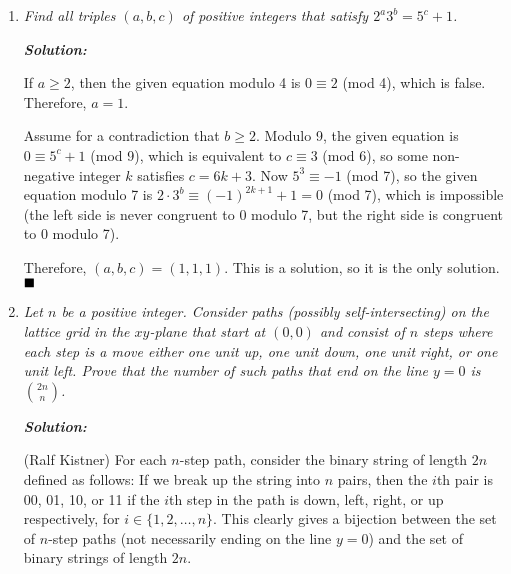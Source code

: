 \documentclass[12pt]{article}
\newcommand{\sol}{\textbf{\textit{Solution: }}}
\begin{document}
\begin{enumerate}
\begin{itemize}
\end{itemize}
Now
\[\begin{aligned}
2022 & = f(2^{2023}) + f(3^{2024}) + f(5^{2025})\\
& = \left(\frac{2 - 2023}{2} + \frac{2 - 2024}{2} + \frac{2 - 2025}{2}\right)f(1)\\
& = -3033f(1),
\end{aligned}\]
so \(f(1) = -2/3\). Therefore, for all positive integers \(n\), we have
\[f(n) = \frac{\Omega(n) - 2}{3}.\]
Now \(2023 = 7 \times 17^{2}\), \(2024 = 2^{3} \times 11 \times 23\), and \(2025 = 3^{4} \times 5^{2}\), so \(\Omega(2023^{2}) = 6\), \(\Omega(2024^{3}) = 15\), and \(\Omega(2025^{5}) = 30\), so
\[f(2023^{2}) + f(2024^{3}) + f(2025^{5}) = \frac{6 - 2}{3} + \frac{15 - 2}{3} + \frac{30 - 2}{3} = 15.\]
This completes the solution. $\hfill\blacksquare$

\item \textit{Find all triples \((a, b, c)\) of positive integers that satisfy \(2^{a}3^{b} = 5^{c} + 1\).}

\sol

If \(a \geqslant 2\), then the given equation modulo 4 is \(0 \equiv 2\) (mod 4), which is false. Therefore, \(a = 1\).

Assume for a contradiction that \(b \geqslant 2\). Modulo 9, the given equation is \(0 \equiv 5^{c} + 1\) (mod 9), which is equivalent to \(c \equiv 3\) (mod 6), so some non-negative integer \(k\) satisfies \(c = 6k + 3\). Now \(5^{3} \equiv -1\) (mod 7), so the given equation modulo 7 is \(2\cdot{}3^{b} \equiv (-1)^{2k + 1} + 1 = 0\) (mod 7), which is impossible (the left side is never congruent to 0 modulo 7, but the right side is congruent to 0 modulo 7).

Therefore, \((a, b, c) = (1, 1, 1)\). This is a solution, so it is the only solution. $\hfill\blacksquare$

\item \textit{Let \(n\) be a positive integer. Consider paths (possibly self-intersecting) on the lattice grid in the \(xy\)-plane that start at \((0, 0)\) and consist of \(n\) steps where each step is a move either one unit up, one unit down, one unit right, or one unit left. Prove that the number of such paths that end on the line \(y = 0\) is \(\binom{2n}{n}\).}

\sol

(Ralf Kistner) For each \(n\)-step path, consider the binary string of length \(2n\) defined as follows: If we break up the string into \(n\) pairs, then the \(i\)th pair is 00, 01, 10, or 11 if the \(i\)th step in the path is down, left, right, or up respectively, for \(i \in \{1, 2, \ldots, n\}\). This clearly gives a bijection between the set of \(n\)-step paths (not necessarily ending on the line \(y = 0\)) and the set of binary strings of length \(2n\).


\end{enumerate}
\end{document}
